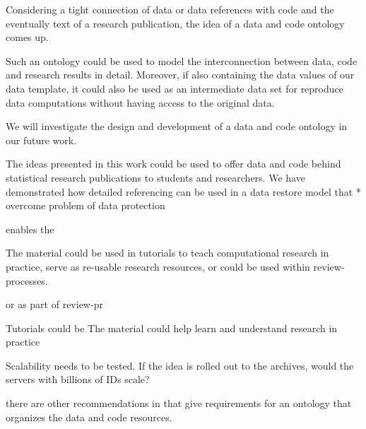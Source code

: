 \documentclass{acm_proc_article-sp}
\begin{document}
 

Considering a tight connection of data or data references with code and the eventually text of a research publication, the idea of a data and code ontology comes up.

Such an ontology could be used to model the interconnection between data, code and research results in detail. Moreover, if also containing the data values of our data template, it could also be used as an intermediate data set for reproduce data computations without having access to the original data.

We will investigate the design and development of a data and code ontology in our future work.





The ideas presented in this work could be used to offer data and code behind statistical research publications to students and researchers.
We have demonstrated how detailed referencing can be used in a data restore model that 
 * overcome problem of data protection

enables the 


The material could be used in tutorials to teach computational research in practice, serve as re-usable research resources, or could be used within review-processes.

or as part of review-pr




Tutorials could be 
The material could help learn and understand research in practice





Scalability needs to be tested. If the idea is rolled out to the archives, would the servers with billions of IDs scale?





%
%


%
%


%
%
%

there are other recommendations in \cite{kleiber2012reproducible}   %
that give requirements for an ontology that organizes the data and code resources.
\end{document}
